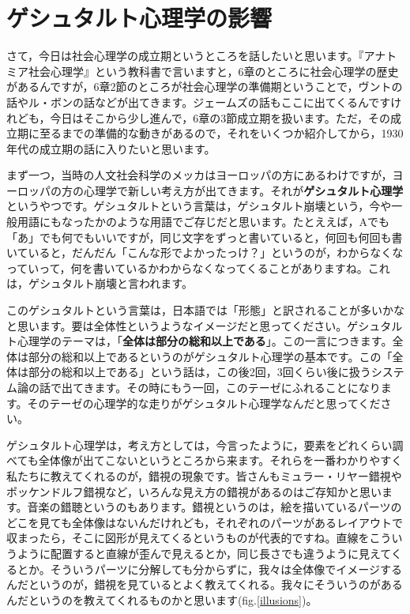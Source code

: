 \documentclass{ltjsbook}
\begin{document}
\section{ゲシュタルト心理学の影響}
さて，今日は社会心理学の成立期というところを話したいと思います。『アナトミア社会心理学』という教科書で言いますと，6章のところに社会心理学の歴史があるんですが，6章2節のところが社会心理学の準備期ということで，ヴントの話やル・ボンの話などが出てきます。ジェームズの話もここに出てくるんですけれども，今日はそこから少し進んで，6章の3節成立期を扱います。ただ，その成立期に至るまでの準備的な動きがあるので，それをいくつか紹介してから，1930年代の成立期の話に入りたいと思います。

まず一つ，当時の人文社会科学のメッカはヨーロッパの方にあるわけですが，ヨーロッパの方の心理学で新しい考え方が出てきます。それが\textbf{ゲシュタルト心理学}というやつです。ゲシュタルトという言葉は，ゲシュタルト崩壊という，今や一般用語にもなったかのような用語でご存じだと思います。たとええば，Aでも「あ」でも何でもいいですが，同じ文字をずっと書いていると，何回も何回も書いていると，だんだん「こんな形でよかったっけ？」というのが，わからなくなっていって，何を書いているかわからなくなってくることがありますね。これは，ゲシュタルト崩壊と言われます。

このゲシュタルトという言葉は，日本語では「形態」と訳されることが多いかなと思います。要は全体性というようなイメージだと思ってください。ゲシュタルト心理学のテーマは，「\textbf{全体は部分の総和以上である}」。この一言につきます。全体は部分の総和以上であるというのがゲシュタルト心理学の基本です。この「全体は部分の総和以上である」という話は，この後2回，3回くらい後に扱うシステム論の話で出てきます。その時にもう一回，このテーゼにふれることになります。そのテーゼの心理学的な走りがゲシュタルト心理学なんだと思ってください。

ゲシュタルト心理学は，考え方としては，今言ったように，要素をどれくらい調べても全体像が出てこないというところから来ます。それらを一番わかりやすく私たちに教えてくれるのが，錯視の現象です。皆さんもミュラー・リヤー錯視やポッケンドルフ錯視など，いろんな見え方の錯視があるのはご存知かと思います。音楽の錯聴というのもあります。錯視というのは，絵を描いているパーツのどこを見ても全体像はないんだけれども，それぞれのパーツがあるレイアウトで収まったら，そこに図形が見えてくるというものが代表的ですね。直線をこういうように配置すると直線が歪んで見えるとか，同じ長さでも違うように見えてくるとか。そういうパーツに分解しても分からずに，我々は全体像でイメージするんだというのが，錯視を見ているとよく教えてくれる。我々にそういうのがあるんだというのを教えてくれるものかと思います(fig.\ref{illusions})。
\end{document}
